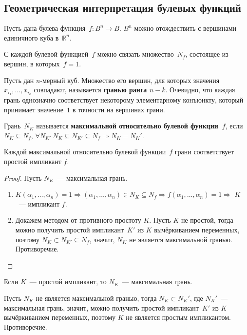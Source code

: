 \subsection{Геометрическая интерпретация булевых функций}
Пусть дана булева функция~$f \colon B^n \to B$.
$B^n$ можно отождествить с вершинами единичного куба в~$\mathbb R^n$.

С каждой булевой функцией~$f$ можно связать множество~$N_f$, состоящее из вершин, в которых~$f = 1$.

Пусть дан $n$-мерный куб.
 Множество его вершин, для которых значения~$x_{i_1}, \ldots, x_{i_k}$ совпадают, называется \textbf{гранью ранга $n - k$}.
Очевидно, что каждая грань однозначно соответствует некоторому элементарному конъюнкту, который принимает значение~$1$ в точности на вершинах грани.

Грань~$N_K$ называется \textbf{максимальной относительно булевой функции~$f$}, если $N_K \subseteq N_f$, $\forall N_{K'} \ N_K \subseteq N_{K'} \subseteq N_f \Rightarrow N_K = N_K'$.

\begin{statement}
Каждой максимальной относительно булевой функции~$f$ грани соответствует простой импликант $f$.
\end{statement}
\begin{proof}
Пусть $N_K$~--- максимальная грань.
\begin{enumerate}
	\item $K(\alpha_1, \ldots, \alpha_n) = 1 \Rightarrow
	(\alpha_1, \ldots, \alpha_n) \in N_K \subseteq N_f \Rightarrow
	f(\alpha_1, \ldots, \alpha_n) = 1 \Rightarrow$
	$K$~--- импликант $f$.
	
	\item Докажем методом от противного простоту $K$.
	Пусть $K$ не простой, тогда можно получить простой импликант~$K'$ из $K$ вычёркиванием переменных, поэтому $N_K \subset N_{K'} \subseteq N_f$, значит, $N_K$ не является максимальной гранью.
	Противоречие.
\end{enumerate}
\end{proof}

\begin{statement}
Если $K$~--- простой импликант, то $N_K$~--- максимальная грань.
\end{statement}
\begin{proofcontra}
Пусть $N_K$ не является максимальной гранью, тогда $N_K \subset N_K'$, где $N_K'$~--- максимальная грань, значит, можно получить простой импликант~$K'$ из $K$ вычёркиванием переменных, поэтому $K$ не является простым импликантом.
Противоречие.
\end{proofcontra}

